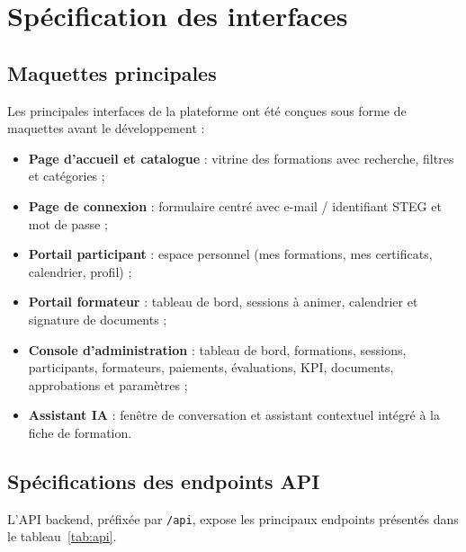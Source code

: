 \documentclass[12pt,a4paper,oneside,openany]{report}
\begin{document}
\section{Spécification des interfaces}

\subsection{Maquettes principales}

Les principales interfaces de la plateforme ont été conçues sous forme de maquettes avant le développement :
\begin{itemize}
    \item \textbf{Page d'accueil et catalogue} : vitrine des formations avec recherche, filtres et catégories ;
    \item \textbf{Page de connexion} : formulaire centré avec e-mail / identifiant STEG et mot de passe ;
    \item \textbf{Portail participant} : espace personnel (mes formations, mes certificats, calendrier, profil) ;
    \item \textbf{Portail formateur} : tableau de bord, sessions à animer, calendrier et signature de documents ;
    \item \textbf{Console d'administration} : tableau de bord, formations, sessions, participants, formateurs, paiements, évaluations, KPI, documents, approbations et paramètres ;
    \item \textbf{Assistant IA} : fenêtre de conversation et assistant contextuel intégré à la fiche de formation.
\end{itemize}

\subsection{Spécifications des endpoints API}

L'API backend, préfixée par \texttt{/api}, expose les principaux endpoints présentés dans le tableau~\ref{tab:api}.
\end{document}
